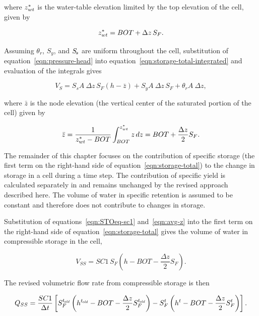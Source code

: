\noindent where ${z_{wt}^*}$ is the water-table elevation limited by the top elevation of the cell, given by

\begin{equation}
	\label{eqn:zwt}
	{z_{wt}^*} = BOT + \Delta z \, S_F .
\end{equation}

\noindent Assuming $\theta_r$, $S_y$, and ${S_{\kern -.1em s}}$ are uniform throughout the cell, substitution of equation~\ref{eqn:pressure-head} into equation~\ref{eqn:storage-total-integrated} and evaluation of the integrals gives

\begin{equation}
	\label{eqn:storage-total}
	V_S = S_s A\ \Delta z\, S_F \left( h - \bar{z} \right) + S_y A\ \Delta z\, S_F + \theta_{r} A\ \Delta z ,
\end{equation}

\noindent where $\bar{z}$ is the node elevation (the vertical center of the saturated portion of the cell) given by

\begin{equation}
	\label{eqn:avg-z}
	\begin{aligned}
		\bar{z} = \frac{1}{{z_{wt}^*} - BOT} \int_{BOT}^{{z_{wt}^*}} z \, dz = BOT + \frac{\Delta z}{2} S_F .
	\end{aligned}
\end{equation}

The remainder of this chapter focuses on the contribution of specific storage (the first term on the right-hand side of equation~\ref{eqn:storage-total}) to the change in storage in a cell during a time step. The contribution of specific yield is calculated separately in \mf and remains unchanged by the revised approach described here. The volume of water in specific retention is assumed to be constant and therefore does not contribute to changes in storage.

Substitution of equations~\ref{eqn:STOeq-sc1} and~\ref{eqn:avg-z} into the first term on the right-hand side of equation~\ref{eqn:storage-total} gives the volume of water in compressible storage in the cell,

\begin{equation}
	\label{eqn:storage-ss-final}
	V_{SS} = SC1 \, S_F \left( h - BOT - \frac{\Delta z}{2} S_F \right) .
\end{equation}

\noindent The revised volumetric flow rate from compressible storage is then

\begin{equation}
	\label{eqn:STOeq-rev}
	Q_{SS} = \frac{SC1}{\Delta t} \left[ S_F^{t_\mathit{\kern -0.07em old}} \left( h^{t_\mathit{\kern -0.07em old}} - BOT - \frac{\Delta z}{2} S_F^{t_\mathit{\kern -0.07em old}} \right) - S_F^t \left( h^t - BOT - \frac{\Delta z}{2} S_F^t \right) \right].
\end{equation}

